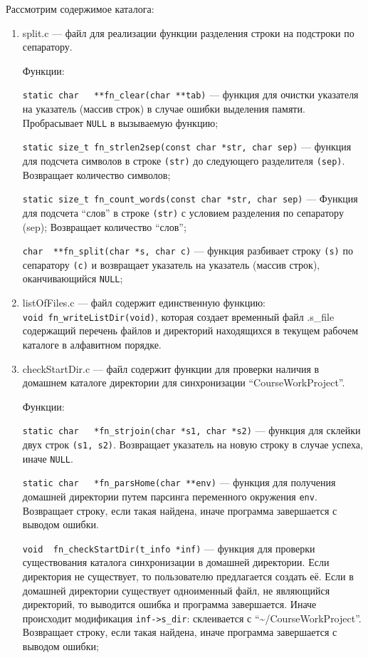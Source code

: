 Рассмотрим содержимое каталога:
\begin{enumerate}
	\item split.c --- файл для реализации функции разделения строки на подстроки по сепаратору.
	
	Функции:
	
	\verb|static char	**fn_clear(char **tab)| --- функция для очистки указателя на указатель (массив строк) в случае ошибки выделения памяти. Пробрасывает \verb|NULL| в вызываемую функцию;
	
	\verb|static size_t	fn_strlen2sep(const char *str, char sep)| --- функция для подсчета символов в строке \verb|(str)| до следующего разделителя \verb|(sep)|. Возвращает количество символов;
	
	\verb|static size_t	fn_count_words(const char *str, char sep)| --- Функция для подсчета ``слов'' в строке \verb|(str)| с условием разделения по сепаратору (sep); Возвращает количество ``слов'';
	
	\verb|char	**fn_split(char *s, char c)| --- функция разбивает строку \verb|(s)| по сепаратору \verb|(c)| и возвращает указатель на указатель (массив строк), оканчивающийся \verb|NULL|;
	
	\item listOfFiles.c --- файл содержит единственную функцию:\\\verb|void	fn_writeListDir(void)|,  которая создает временный файл .s\_file содержащий перечень файлов и директорий находящихся в текущем рабочем каталоге в алфавитном порядке.
	
	\item checkStartDir.c --- файл содержит функции для проверки наличия в домашнем каталоге директории для синхронизации ``CourseWorkProject''.
	
	Функции: 
	
	\verb|static char	*fn_strjoin(char *s1, char *s2)| --- функция для склейки двух строк \verb|(s1, s2)|. Возвращает указатель на новую строку в случае успеха, иначе \verb|NULL|.
	
	\verb|static char	*fn_parsHome(char **env)| --- функция для получения домашней директории путем парсинга переменного окружения \verb|env|. Возвращает строку, если такая найдена, иначе программа завершается с выводом ошибки.
	
	\verb|void	fn_checkStartDir(t_info *inf)| --- функция для проверки существования каталога синхронизации в домашней директории. Если директория не существует, то пользователю предлагается создать её. Если в домашней директории существует одноименный файл, не являющийся директорий, то выводится ошибка и программа завершается. Иначе происходит модификация \verb|inf->s_dir|: склеивается с ``\~{}/CourseWorkProject''. Возвращает строку, если такая найдена, иначе программа завершается с выводом ошибки;
	

\end{enumerate}
